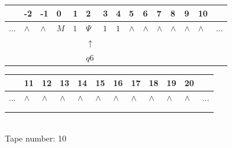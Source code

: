 \documentclass[11pt]{article}
\begin{document}
\begin{table}[H]
\centering
\begin{tabular}{lllllllllllllll}
 & -2 & -1 & 0 & 1 & 2 & 3 & 4 & 5 & 6 & 7 & 8 & 9 & 10 & \\
\hline
$...$ & \multicolumn{1}{|l|}{$\wedge$} & \multicolumn{1}{|l|}{$\wedge$} & \multicolumn{1}{|l|}{$M$} & \multicolumn{1}{|l|}{$1$} & \multicolumn{1}{|l|}{$\Psi$} & \multicolumn{1}{|l|}{$1$} & \multicolumn{1}{|l|}{$1$} & \multicolumn{1}{|l|}{$\wedge$} & \multicolumn{1}{|l|}{$\wedge$} & \multicolumn{1}{|l|}{$\wedge$} & \multicolumn{1}{|l|}{$\wedge$} & \multicolumn{1}{|l|}{$\wedge$} & \multicolumn{1}{|l|}{$\wedge$} & $...$\\
\hline
&  &  &  &  & $\uparrow$ &  &  &  &  &  &  &  &  &  \\
&  &  &  &  & $ q6 $ &  &  &  &  &  &  &  &  &  \\
\end{tabular}
\begin{tabular}{llllllllllll}
 & 11 & 12 & 13 & 14 & 15 & 16 & 17 & 18 & 19 & 20 & \\
\hline
$...$ & \multicolumn{1}{|l|}{$\wedge$} & \multicolumn{1}{|l|}{$\wedge$} & \multicolumn{1}{|l|}{$\wedge$} & \multicolumn{1}{|l|}{$\wedge$} & \multicolumn{1}{|l|}{$\wedge$} & \multicolumn{1}{|l|}{$\wedge$} & \multicolumn{1}{|l|}{$\wedge$} & \multicolumn{1}{|l|}{$\wedge$} & \multicolumn{1}{|l|}{$\wedge$} & \multicolumn{1}{|l|}{$\wedge$} & $...$\\
\hline
&  &  &  &  &  &  &  &  &  &  &  \\
&  &  &  &  &  &  &  &  &  &  &  \\
\end{tabular}
\\
Tape number: 10
\noindent\makebox[\linewidth]{\hdashrule{\textwidth}{1pt}{1pt}}\end{table}
\end{document}
